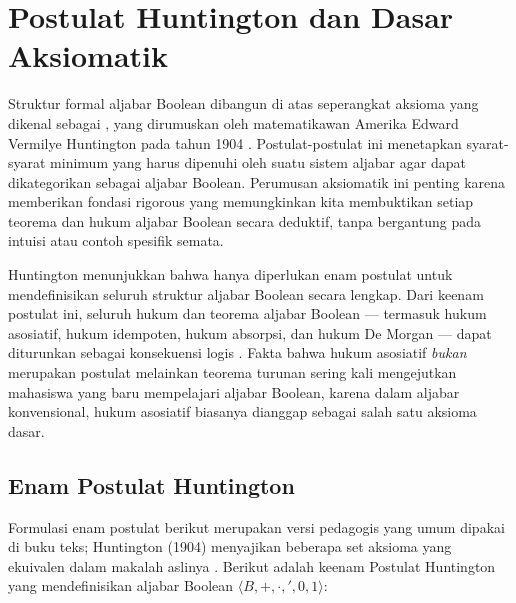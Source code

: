 \section{Postulat Huntington dan Dasar Aksiomatik}

Struktur formal aljabar Boolean dibangun di atas seperangkat aksioma yang dikenal sebagai , yang dirumuskan oleh matematikawan Amerika Edward Vermilye Huntington pada tahun 1904 \cite{huntington1904}. Postulat-postulat ini menetapkan syarat-syarat minimum yang harus dipenuhi oleh suatu sistem aljabar agar dapat dikategorikan sebagai aljabar Boolean. Perumusan aksiomatik ini penting karena memberikan fondasi rigorous yang memungkinkan kita membuktikan setiap teorema dan hukum aljabar Boolean secara deduktif, tanpa bergantung pada intuisi atau contoh spesifik semata.

Huntington menunjukkan bahwa hanya diperlukan enam postulat untuk mendefinisikan seluruh struktur aljabar Boolean secara lengkap. Dari keenam postulat ini, seluruh hukum dan teorema aljabar Boolean --- termasuk hukum asosiatif, hukum idempoten, hukum absorpsi, dan hukum De Morgan --- dapat diturunkan sebagai konsekuensi logis \cite{rosen2019}. Fakta bahwa hukum asosiatif \emph{bukan} merupakan postulat melainkan teorema turunan sering kali mengejutkan mahasiswa yang baru mempelajari aljabar Boolean, karena dalam aljabar konvensional, hukum asosiatif biasanya dianggap sebagai salah satu aksioma dasar.

\subsection{Enam Postulat Huntington}

Formulasi enam postulat berikut merupakan versi pedagogis yang umum dipakai di buku teks; Huntington (1904) menyajikan beberapa set aksioma yang ekuivalen dalam makalah aslinya \cite{huntington1904}. Berikut adalah keenam Postulat Huntington yang mendefinisikan aljabar Boolean $\langle B, +, \cdot, ', 0, 1 \rangle$:

